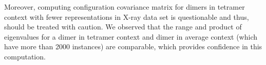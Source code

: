 Moreover, computing configuration covariance matrix for dimers in tetramer context with fewer representations in X-ray data set is questionable and thus, should be treated with caution.
We observed that the range and product of eigenvalues for a dimer in tetramer context and dimer in average context (which have more than 2000 instances) are comparable, which provides confidence in this computation. %


